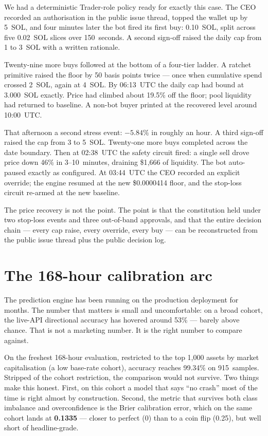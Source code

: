 \documentclass[11pt,a4paper]{article}
\begin{document}
We had a deterministic Trader-role policy ready for exactly this case.
The CEO recorded an authorisation in the public issue thread, topped
the wallet up by 5~SOL, and four minutes later the bot fired its first
buy: 0.10~SOL, split across five 0.02~SOL slices over 150~seconds. A
second sign-off raised the daily cap from 1 to 3~SOL with a written
rationale.

Twenty-nine more buys followed at the bottom of a four-tier ladder. A
ratchet primitive raised the floor by 50 basis points twice --- once
when cumulative spend crossed 2~SOL, again at 4~SOL. By 06:13~UTC the
daily cap had bound at 3.000~SOL exactly. Price had climbed about 19.5\%
off the floor; pool liquidity had returned to baseline. A non-bot buyer
printed at the recovered level around 10:00~UTC.

That afternoon a second stress event: $-5.84\%$ in roughly an hour. A
third sign-off raised the cap from 3 to 5~SOL. Twenty-one more buys
completed across the date boundary. Then at 02:38~UTC the safety
circuit fired: a single sell drove price down 46\% in 3--10~minutes,
draining \$1{,}666 of liquidity. The bot auto-paused exactly as
configured. At 03:44~UTC the CEO recorded an explicit override; the
engine resumed at the new \$0.0000414 floor, and the stop-loss circuit
re-armed at the new baseline.

The price recovery is not the point. The point is that the constitution
held under two stop-loss events and three out-of-band approvals, and
that the entire decision chain --- every cap raise, every override,
every buy --- can be reconstructed from the public issue thread plus the
public decision log.

\section*{The 168-hour calibration arc}

The prediction engine has been running on the production deployment for
months. The number that matters is small and uncomfortable: on a broad
cohort, the live-API directional accuracy has hovered around 53\% ---
barely above chance. That is not a marketing number. It is the right
number to compare against.

On the freshest 168-hour evaluation, restricted to the top 1{,}000
assets by market capitalisation (a low base-rate cohort), accuracy
reaches 99.34\% on 915~samples. Stripped of the cohort restriction, the
comparison would not survive. Two things make this honest. First, on
this cohort a model that says ``no crash'' most of the time is right
almost by construction. Second, the metric that survives both class
imbalance and overconfidence is the Brier calibration error, which on
the same cohort lands at \textbf{0.1335} --- closer to perfect (0)
than to a coin flip (0.25), but well short of headline-grade.
\end{document}
